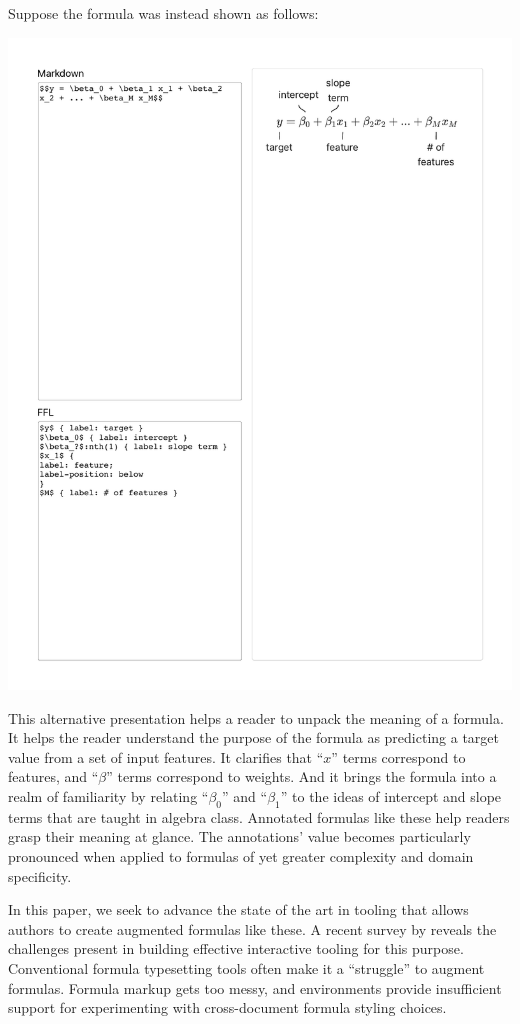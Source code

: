 Suppose the formula was instead shown as follows:

\begin{center}
\vspace{0.5ex}
\includegraphics[width=0.65\linewidth]{fig/aug-intro}
\vspace{0.5ex}
\end{center}

This alternative presentation helps a reader to unpack the meaning of a formula. It helps the reader understand the purpose of the formula as predicting a target value from a set of input features. It clarifies that ``$x$'' terms correspond to features, and ``$\beta$'' terms correspond to weights. And it brings the formula into a realm of familiarity by relating ``$\beta_0$'' and ``$\beta_1$'' to the ideas of intercept and slope terms that are taught in algebra class.
Annotated formulas like these help readers grasp their meaning at glance. The annotations' value becomes particularly pronounced when applied to formulas of yet greater complexity and domain specificity.

In this paper, we seek to advance the state of the art in tooling that allows authors to create augmented formulas like these. A recent survey by \citet{ref:head2022math} reveals the challenges present in building effective interactive tooling for this purpose. Conventional formula typesetting tools often make it a ``struggle'' to augment formulas. Formula markup gets too messy, and environments provide insufficient support for experimenting with cross-document formula styling choices.

